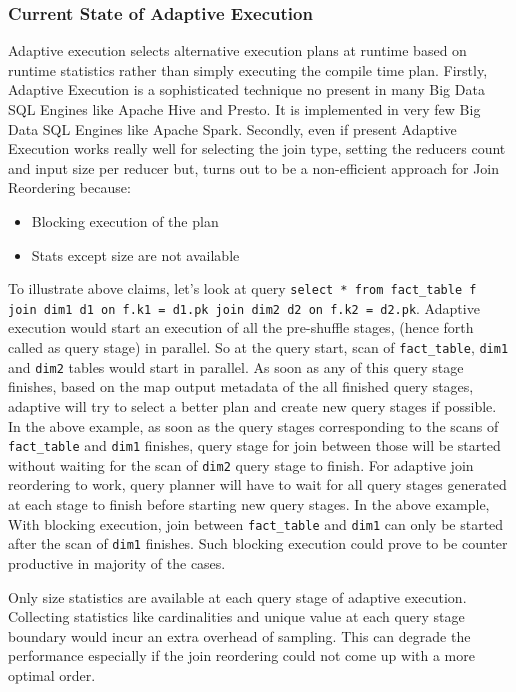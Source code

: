 \subsubsection{Current State of Adaptive Execution}
Adaptive execution selects alternative execution plans at runtime based on runtime statistics rather than simply executing the compile time plan. Firstly, Adaptive  Execution is a sophisticated technique no present in many Big Data SQL Engines like Apache Hive and Presto. It is implemented in very few Big Data SQL Engines like Apache Spark.
Secondly, even if present Adaptive Execution works really well for selecting the join type, setting the reducers count and input size per reducer but, turns out to be a non-efficient approach for Join Reordering because:
\begin{itemize}
    \item Blocking execution of the plan
    \item Stats except size are not available
\end{itemize}

To illustrate above claims, let's look at query \texttt{select * from fact\_table f join dim1 d1 on f.k1 = d1.pk join dim2 d2 on f.k2 = d2.pk}. Adaptive execution would start an execution of all the pre-shuffle stages, (hence forth called as query stage) in parallel. So at the query start, scan of \texttt{fact\_table}, \texttt{dim1}  and \texttt{dim2} tables would start in parallel. As soon as any of this query stage finishes, based on the map output metadata of the all finished query stages, adaptive will try to select a better plan and create new query stages if possible. In the above example, as soon as the query stages corresponding to the scans of \texttt{fact\_table} and \texttt{dim1} finishes, query stage for join between those will be started without waiting for the scan of \texttt{dim2} query stage to finish. For adaptive join reordering to work, query planner will have to wait for all query stages generated at each stage to finish before starting new query stages. In the above example, With blocking execution, join between \texttt{fact\_table} and \texttt{dim1} can only be started after the scan of \texttt{dim1} finishes. Such blocking execution could prove to be counter productive in majority of the cases.

Only size statistics are available at each query stage of adaptive execution. Collecting statistics like cardinalities and unique value at each query stage boundary would incur an extra overhead of sampling. This can degrade the performance especially if the join reordering could not come up with a more optimal order.